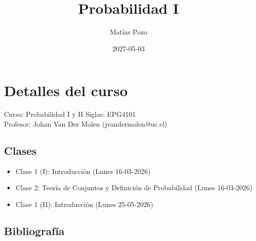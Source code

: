 \documentclass[
  letterpaper,
  DIV=11,
  numbers=noendperiod]{scrreprt}
\title{Probabilidad I}
\author{Matías Pozo}
\date{2027-05-03}
\providecommand{\tightlist}{%
  \setlength{\itemsep}{0pt}\setlength{\parskip}{0pt}}
\renewcommand*\contentsname{Table of contents}
\newcommand\contentsname{Table of contents}
\begin{document}
\maketitle

\renewcommand*\contentsname{Table of contents}
{
\setcounter{tocdepth}{2}
\tableofcontents
}


\chapter*{Detalles del curso}\label{detalles-del-curso}


Curso: Probabilidad I y II Siglas: EPG4101\\
Profesor: Johan Van Der Molen (jvandermolen@uc.cl)

\section*{Clases}\label{clases}


\begin{itemize}
\tightlist
\item
  Clase 1 (I): Introducción (Lunes 16-03-2026)\\
\item
  Clase 2: Teoría de Conjuntos y Definición de Probabilidad (Lunes
  16-03-2026)
\item
  Clase 1 (II): Introducción (Lunes 25-05-2026)
\end{itemize}

\section*{Bibliografía}\label{bibliografuxeda}

\end{document}
